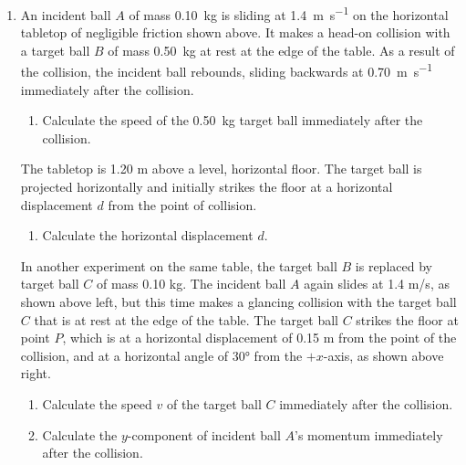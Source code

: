\documentclass{../../../oss-apphys}
\begin{document}
\begin{enumerate}[leftmargin=15pt]
\begin{enumerate}[nosep]
  \item Suppose that there is a passenger of mass \SI{70}{\kilo\gram} in the
    elevator. Calculate the apparent weight of the passenger at time
    $t=\SI{4}{\second}$.
  \end{enumerate}
  \vspace{1in}
  \newpage
  
  \begin{center}
  \end{center}
\item An incident ball $A$ of mass \SI{.10}{\kilo\gram} is sliding at
  \SI{1.4}{\metre\per\second} on the horizontal tabletop of negligible friction
  shown above. It makes a head-on collision with a target ball $B$ of mass
  \SI{.50}{\kilo\gram} at rest at the edge of the table. As a result of the
  collision, the incident ball rebounds, sliding backwards at
  \SI{.70}{\metre\per\second} immediately after the collision.
  \begin{enumerate}[nosep]
  \item Calculate the speed of the \SI{.50}{\kilo\gram} target ball immediately
    after the collision.
  \end{enumerate}
  The tabletop is 1.20 m above a level, horizontal floor. The target ball is
  projected horizontally and initially strikes the floor at a horizontal
  displacement $d$ from the point of collision.
  \begin{enumerate}[nosep]
  \item Calculate the horizontal displacement $d$.
  \end{enumerate}
  \newpage
  
  \begin{center}
  \end{center}
  In another experiment on the same table, the target ball $B$ is replaced by
  target ball $C$ of mass 0.10 kg. The incident ball $A$ again slides at
  1.4 m/s, as shown above left, but this time makes a glancing collision with
  the target ball $C$ that is at rest at the edge of the table. The target ball
  $C$ strikes the floor at point $P$, which is at a horizontal displacement of
  0.15 m from the point of the collision, and at a horizontal angle of \ang{30}
  from the $+x$-axis, as shown above right.
  \begin{enumerate}[nosep]
  \item Calculate the speed $v$ of the target ball $C$ immediately after the
    collision.
  \item Calculate the $y$-component of incident ball $A$'s momentum immediately
    after the collision.
  \end{enumerate}
  \newpage


\end{enumerate}
\end{document}
